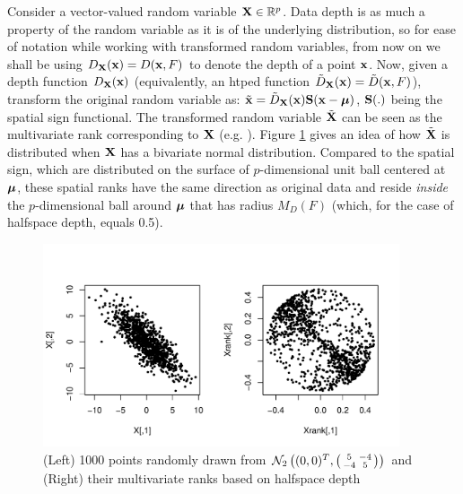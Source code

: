 \documentclass[10pt]{book}
\begin{document}
\vspace{1em}
\setcounter{chapter}{3}
\setcounter{equation}{0} %
\vspace{1em}

Consider a vector-valued random variable ${\mathbf{X}} \in \mathbb{R}^p$. Data depth is as much a property of the random variable as it is of the underlying distribution, so for ease of notation while working with transformed random variables, from now on we shall be using $D_{\mathbf{X}}({\bf{x}}) = D({\bf{x}}, F)$ to denote the depth of a point ${\bf{x}}$. Now, given a depth function $D_{{\mathbf{X}}}({\bf{x}})$ (equivalently, an htped function $\tilde D_{\mathbf{X}}({\bf{x}}) = \tilde D({\bf{x}}, F)$), transform the original random variable as: $\tilde {{\bf{x}}} = \tilde D_{\mathbf{X}}({\bf{x}}) {\mathbf{S}}({\bf{x}} - {\boldsymbol{\mu}})$, ${\mathbf{S}}(.)$ being the spatial sign functional. The transformed random variable $\tilde {{\mathbf{X}}}$ can be seen as the multivariate rank corresponding to ${\mathbf{X}}$ (e.g. \cite{serfling2006}). Figure \ref{fig:rankplot} gives an idea of how $\tilde {{\mathbf{X}}}$ is distributed when ${\mathbf{X}}$ has a bivariate normal distribution. Compared to the spatial sign, which are distributed on the surface of $p$-dimensional unit ball centered at ${\boldsymbol{\mu}}$, these spatial ranks have the same direction as original data and reside \textit{inside} the $p$-dimensional ball around ${\boldsymbol{\mu}}$ that has radius $M_D(F)$ (which, for the case of halfspace depth, equals 0.5).

\begin{figure}[t]
	\captionsetup{singlelinecheck=off}
	\centering
		\includegraphics[height=6cm]{ranks}
	\caption{(Left) 1000 points randomly drawn from $\mathcal N_2\left((0,0)^T, \left(\protect\begin{smallmatrix} 5 & -4 \\ -4 & 5 \protect\end{smallmatrix}\right)\right) $ and (Right) their multivariate ranks based on halfspace depth}
	\label{fig:rankplot}
\end{figure}
\end{document}
